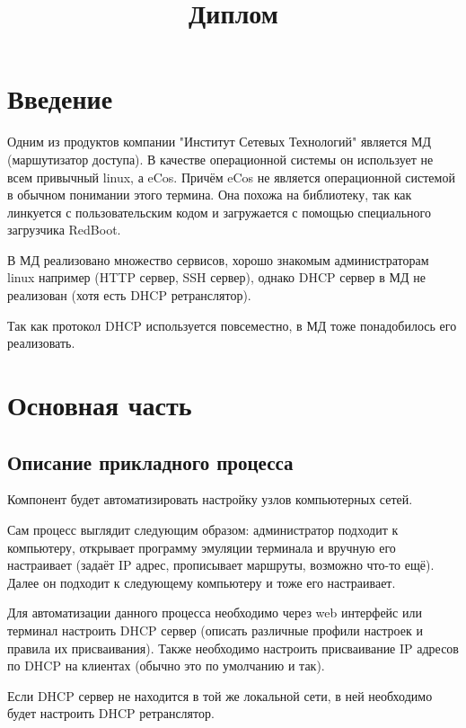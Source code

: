 \documentclass[12pt]{article}
\title{Диплом}
\begin{document}
\maketitle
\pagebreak
\section{Введение}


Одним из продуктов компании "Институт Сетевых Технологий" является МД (маршутизатор доступа). В качестве операционной системы он использует не всем привычный linux, а eCos. Причём eCos не является операционной системой в обычном понимании этого термина. Она похожа на библиотеку, так как линкуется с пользовательским кодом и загружается с помощью специального загрузчика RedBoot.

В МД реализовано множество сервисов, хорошо знакомым администраторам linux например (HTTP сервер, SSH сервер), однако DHCP сервер в МД не реализован (хотя есть DHCP ретранслятор).

Так как протокол DHCP используется повсеместно, в МД тоже понадобилось его реализовать.




\pagebreak
\section{Основная часть}

\subsection{Описание прикладного процесса}
Компонент будет автоматизировать настройку узлов компьютерных сетей.

Сам процесс выглядит следующим образом:
администратор подходит к компьютеру, открывает программу эмуляции терминала и вручную его настраивает (задаёт IP адрес, прописывает маршруты, возможно что-то ещё). Далее он подходит к следующему компьютеру и тоже его настраивает.

Для автоматизации данного процесса необходимо через web интерфейс или терминал настроить DHCP сервер (описать различные профили настроек и правила их присваивания). Также необходимо настроить присваивание IP адресов по DHCP на клиентах (обычно это по умолчанию и так).

Если DHCP сервер не находится в той же локальной сети, в ней необходимо будет настроить DHCP ретранслятор.
\end{document}
